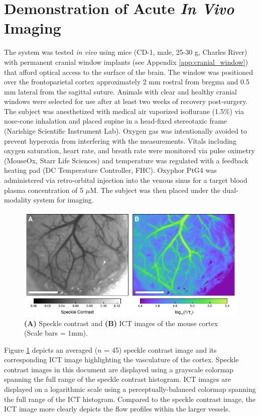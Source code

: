 \section{Demonstration of Acute \textit{In Vivo} Imaging}

The system was tested \textit{in vivo} using mice (CD-1, male, 25-30 g, Charles River) with permanent cranial window implants (see Appendix \ref{app:cranial_window}) that afford optical access to the surface of the brain. The window was positioned over the frontoparietal cortex approximately 2 mm rostral from bregma and 0.5 mm lateral from the sagittal suture. Animals with clear and healthy cranial windows were selected for use after at least two weeks of recovery post-surgery. The subject was anesthetized with medical air vaporized isoflurane (1.5\%) via nose-cone inhalation and placed supine in a head-fixed stereotaxic frame (Narishige Scientific Instrument Lab). Oxygen gas was intentionally avoided to prevent hyperoxia from interfering with the  measurements. Vitals including oxygen saturation, heart rate, and breath rate were monitored via pulse oximetry (MouseOx, Starr Life Sciences) and temperature was regulated with a feedback heating pad (DC Temperature Controller, FHC). Oxyphor PtG4 was administered via retro-orbital injection into the venous sinus for a target blood plasma concentration of 5 $\mu$M. The subject was then placed under the dual-modality system for imaging.

\begin{figure}
    \includegraphics{figures/chapter_2/staticspeckle.pdf}
    \caption{
        \label{fig:staticspeckle}
        \textbf{(A)} Speckle contrast and \textbf{(B)} ICT images of the mouse cortex (Scale bars = 1mm).
    }
\end{figure}

Figure \ref{fig:staticspeckle} depicts an averaged ($n$ = 45) speckle contrast image and its corresponding ICT image highlighting the vasculature of the cortex. Speckle contrast images in this document are displayed using a grayscale colormap spanning the full range of the speckle contrast histogram. ICT images are displayed on a logarithmic scale using a perceptually-balanced colormap \cite{Niccoli:vx} spanning the full range of the ICT histogram. Compared to the speckle contrast image, the ICT image more clearly depicts the flow profiles within the larger vessels.

